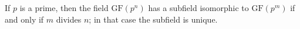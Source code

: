 If $p$ is a prime, then the field $\mathrm{GF}(p^n)$ has a subfield isomorphic to $\mathrm{GF}(p^m)$ if and only if $m$ divides $n$; in that case the subfield is unique.

